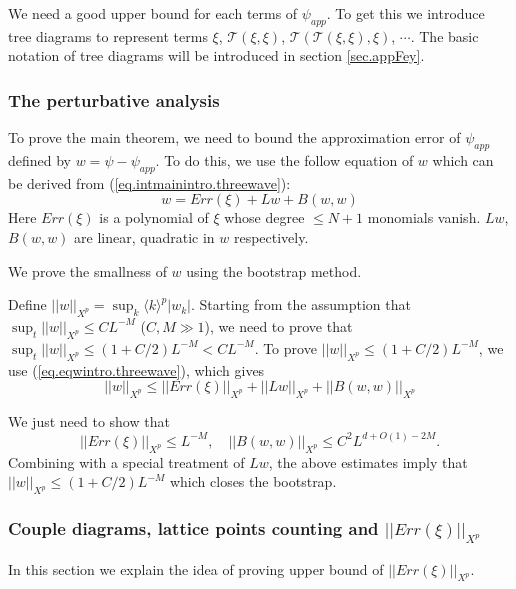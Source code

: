 We need a good upper bound for each terms of $\psi_{app}$. To get this we introduce tree diagrams to represent terms $\xi$, $\mathcal{T}(\xi,\xi)$, $\mathcal{T}(\mathcal{T}(\xi,\xi),\xi)$, $\cdots$. The basic notation of tree diagrams will be introduced in section \ref{sec.appFey}.

\subsubsection{The perturbative analysis}\label{sec.pert intro} To prove the main theorem, we need to bound the approximation error of $\psi_{app}$ defined by $w=\psi-\psi_{app}$. To do this, we use the follow equation of $w$ which can be derived from (\ref{eq.intmainintro.threewave}):
\begin{equation}\label{eq.eqwintro.threewave}
    w= Err(\xi)+Lw+B(w,w)
\end{equation}
Here $Err(\xi)$ is a polynomial of $\xi$ whose degree $\le N+1$ monomials vanish. $Lw$, $B(w,w)$ are linear, quadratic in $w$ respectively.

We prove the smallness of $w$ using the bootstrap method.

Define $||w||_{X^p}=\sup_{k} \langle k\rangle^{p} |w_k|$. Starting from the assumption that $\sup_t||w||_{X^p}\le CL^{-M}$ ($C,M\gg 1$), we need to prove that $\sup_t||w||_{X^p}\le (1+C/2)L^{-M}<CL^{-M}$. To prove $||w||_{X^p}\le (1+C/2)L^{-M}$, we use (\ref{eq.eqwintro.threewave}), which gives
\begin{equation}\label{eq.ineqw.threewave}
    ||w||_{X^p}\le ||Err(\xi)||_{X^p}+||Lw||_{X^p}+||B(w,w)||_{X^p}
\end{equation}

We just need to show that 
\begin{equation}
    ||Err(\xi)||_{X^p}\le L^{-M},
    \quad ||B(w,w)||_{X^p}\le C^2L^{d+O(1)-2M}.
\end{equation}
Combining with a special treatment of $Lw$, the above estimates imply that $||w||_{X^p}\le (1+C/2)L^{-M}$ which closes the bootstrap.


\subsubsection{Couple diagrams, lattice points counting and $||Err(\xi)||_{X^p}$}\label{sec.latticeintro} In this section we explain the idea of proving upper bound of $||Err(\xi)||_{X^p}$.

